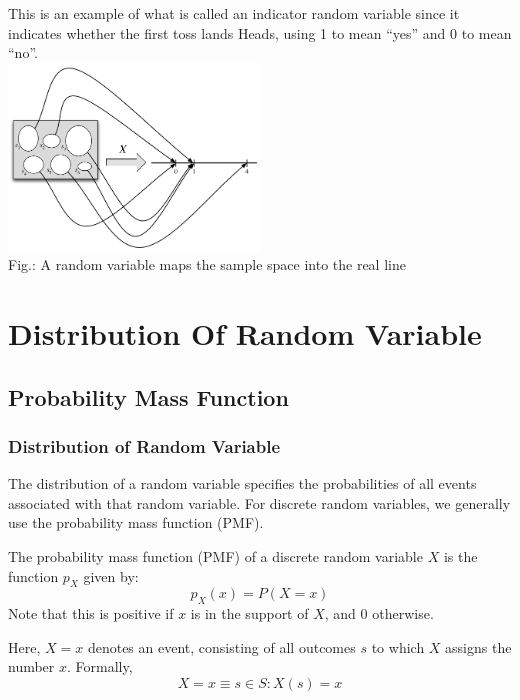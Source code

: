 \documentclass{beamer}
\begin{document}
\begin{frame}
    This is an example of what is called an indicator random variable since it indicates whether the first toss lands Heads, using 1 to mean “yes” and 0 to mean “no”.  
    \\
    \includegraphics[width=0.5\textwidth]{randomvariable.png}
    \\
    Fig.: A random variable maps the sample space into the real line
\end{frame}
     
\section{Distribution Of Random Variable}
\subsection{Probability Mass Function}
\begin{frame}
    \frametitle{Distribution of Random Variable}
    The distribution of a random variable specifies the probabilities of all events associated with that random variable. For discrete random variables, we generally use the probability mass function (PMF).

    The probability mass function (PMF) of a discrete random variable $X$ is the function $p_X$ given by:
    $$p_X (x) = P (X = x)$$
    Note that this is positive if $x$ is in the support of $X$, and $0$ otherwise.

    Here, $X = x$ denotes an event, consisting of all outcomes $s$ to which $X$ assigns the number $x$. Formally,
    $${X = x} \equiv {s \in S : X(s) = x}$$
\end{frame}
\end{document}
